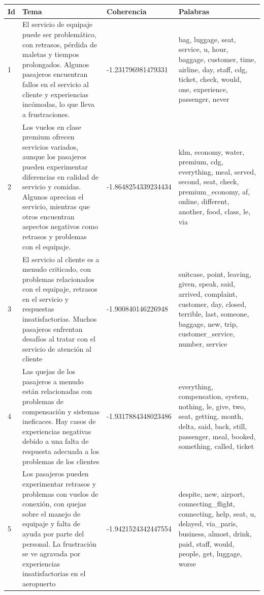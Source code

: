 \documentclass{report}
\begin{document}
                \begin{longtable}{|p{1cm}|p{4cm}|p{4cm}|p{6cm}|}
                    \hline
                    \textbf{Id} & \textbf{Tema} & \textbf{Coherencia} & \textbf{Palabras} \\
                    \hline
                    1 & El servicio de equipaje puede ser problemático, con retrasos, pérdida de maletas y tiempos prolongados. Algunos pasajeros encuentran fallos en el servicio al cliente y experiencias incómodas, lo que lleva a frustraciones. & -1.231796981479331 & bag, luggage, seat, service, u, hour, baggage, customer, time, airline, day, staff, cdg, ticket, check, would, one, experience, passenger, never \\
                    \hline
                    2 & Los vuelos en clase premium ofrecen servicios variados, aunque los pasajeros pueden experimentar diferencias en calidad de servicio y comidas. Algunos aprecian el servicio, mientras que otros encuentran aspectos negativos como retrasos y problemas con el equipaje. & -1.8648254339234434 & klm, economy, water, premium, cdg, everything, meal, served, second, seat, check, premium\_economy, af, online, different, another, food, class, le, via \\
                    \hline
                    3 & El servicio al cliente es a menudo criticado, con problemas relacionados con el equipaje, retrasos en el servicio y respuestas insatisfactorias. Muchos pasajeros enfrentan desafíos al tratar con el servicio de atención al cliente & -1.900840146226948 & suitcase, point, leaving, given, speak, said, arrived, complaint, customer, day, closed, terrible, last, someone, baggage, new, trip, customer\_service, number, service \\
                    \hline
                    4 & Las quejas de los pasajeros a menudo están relacionadas con problemas de compensación y sistemas ineficaces. Hay casos de experiencias negativas debido a una falta de respuesta adecuada a los problemas de los clientes & -1.9317884348023486 & everything, compensation, system, nothing, le, give, two, seat, getting, month, delta, said, back, still, passenger, meal, booked, something, called, ticket \\
                    \hline
                    5 & Los pasajeros pueden experimentar retrasos y problemas con vuelos de conexión, con quejas sobre el manejo de equipaje y falta de ayuda por parte del personal. La frustración se ve agravada por experiencias insatisfactorias en el aeropuerto & -1.9421524342447554 & despite, new, airport, connecting\_flight, connecting, help, seat, u, delayed, via\_paris, business, almost, drink, paid, staff, would, people, get, luggage, worse \\

\end{longtable}
\end{document}
